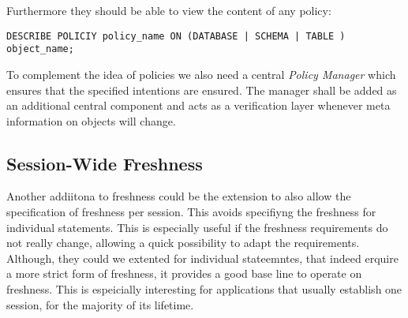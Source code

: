 Furthermore they should be able to view the content of any policy: 
\begin{verbatim}
DESCRIBE POLICIY policy_name ON (DATABASE | SCHEMA | TABLE ) object_name; 
\end{verbatim}

To complement the idea of policies we also need a central \emph{Policy Manager} which ensures that the specified intentions are ensured.
The manager shall be added as an additional central component and acts as a verification layer whenever meta information on objects will change.


\subsection{Session-Wide Freshness}
Another addiitona to freshness could be the extension to also allow the specification
of freshness per session. This avoids specifiyng the freshness for individual statements.
This is especially useful if the freshness requirements do not really change, allowing a quick
possibility to adapt the requirements. Although, they could we extented for individual stateemntes,
that indeed erquire a more strict form of freshness, it provides a good base line to operate on freshness.
This is espeicially interesting for applications that usually establish one session,
for the majority of its lifetime. 

